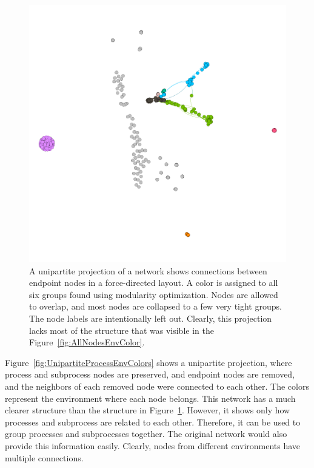 \documentclass[english, 12pt, a4paper, sci, utf8, a-2b, online, obeyspaces]{aaltothesis}
\begin{document}
\begin{figure}[htb!]
  \centering
  \includegraphics[width=\textwidth]{pictures/network/UnipartiteEndpoints.png}
  \caption{A unipartite projection of a network shows connections between endpoint nodes in a force-directed layout. A color is assigned to all six groups found using modularity optimization. Nodes are allowed to overlap, and most nodes are collapsed to a few very tight groups. The node labels are intentionally left out. Clearly, this projection lacks most of the structure that was visible in the Figure~\ref{fig:AllNodesEnvColor}.}
  \label{fig:UnipartiteEndpoints}
\end{figure}

Figure~\ref{fig:UnipartiteProcessEnvColors} shows a unipartite projection, where process and subprocess nodes are preserved, and endpoint nodes are removed, and the neighbors of each removed node were connected to each other. The colors represent the environment where each node belongs. This network has a much clearer structure than the structure in Figure~\ref{fig:UnipartiteEndpoints}. However, it shows only how processes and subprocess are related to each other. Therefore, it can be used to group processes and subprocesses together. The original network would also provide this information easily. Clearly, nodes from different environments have multiple connections.
\end{document}
